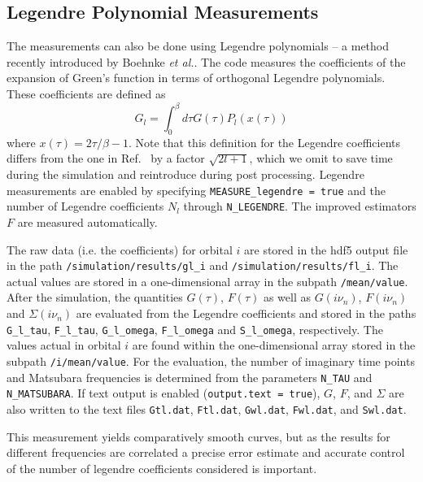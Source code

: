 \documentclass[aps,prb,floatfix,superscriptaddress,twocolumn,notitlepage]{revtex4-1}
\newcommand{\iom}{{\ensuremath{i\nu}}}
\begin{document}
\subsection{Legendre Polynomial Measurements}
The measurements can also be done using Legendre polynomials -- a method recently introduced by Boehnke {\it et al.}\cite{Boehnke11}.
The code measures the coefficients of the expansion of Green's function in terms of orthogonal Legendre polynomials. These coefficients are defined as
\begin{equation}
G_{l} = \int_{0}^{\beta}d\tau G(\tau) P_{l}(x(\tau)) 
\end{equation}
where $x(\tau)=2\tau/\beta -1$. Note that this definition for the Legendre coefficients differs from the one in Ref.~ by a factor $\sqrt{2l+1}$, which we omit to save time during the simulation and reintroduce during post processing.
Legendre measurements are enabled by specifying \verb#MEASURE_legendre = true# and the number of Legendre coefficients $N_{l}$ through \verb#N_LEGENDRE#. 
The improved estimators $F$ \cite{Hafermann12} are measured automatically.

The raw data (i.e. the coefficients) for orbital $i$ are stored in the hdf5 output file in the path \verb#/simulation/results/gl_i# and \verb#/simulation/results/fl_i#. The actual values are stored in a one-dimensional array in the subpath \verb#/mean/value#. After the simulation, the quantities $G(\tau)$, $F(\tau)$ as well as $G(\iom_{n})$, $F(\iom_{n})$ and $\Sigma(\iom_{n})$ are evaluated from the Legendre coefficients and stored in the paths \verb#G_l_tau#, \verb#F_l_tau#, \verb#G_l_omega#, \verb#F_l_omega# and \verb#S_l_omega#, respectively. The values actual in orbital $i$ are found within the one-dimensional array stored in the subpath \verb#/i/mean/value#. For the evaluation, the number of imaginary time points and Matsubara frequencies is determined from the parameters \verb#N_TAU# and \verb#N_MATSUBARA#.
If text output is enabled (\verb#output.text = true#), $G$, $F$, and $\Sigma$ are also written to the text files \verb#Gtl.dat#, \verb#Ftl.dat#, \verb#Gwl.dat#, \verb#Fwl.dat#, and \verb#Swl.dat#.

This measurement yields comparatively smooth curves, but as the results for different frequencies are correlated a precise error estimate and accurate control of the number of legendre coefficients considered is important.
\end{document}

